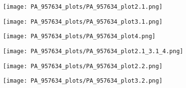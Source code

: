 \documentclass{article}
\begin{document}
	\begin{figure}
		\texttt{[image: PA\_957634\_plots/PA\_957634\_plot2.1.png]}
	\end{figure}
	\begin{figure}
		\texttt{[image: PA\_957634\_plots/PA\_957634\_plot3.1.png]}
	\end{figure}
	\begin{figure}
		\texttt{[image: PA\_957634\_plots/PA\_957634\_plot4.png]}
	\end{figure}
	\begin{figure}
		\texttt{[image: PA\_957634\_plots/PA\_957634\_plot2.1\_3.1\_4.png]}
	\end{figure}
	\begin{figure}
		\texttt{[image: PA\_957634\_plots/PA\_957634\_plot2.2.png]}
	\end{figure}
	\begin{figure}
		\texttt{[image: PA\_957634\_plots/PA\_957634\_plot3.2.png]}
	\end{figure}
\end{document}
